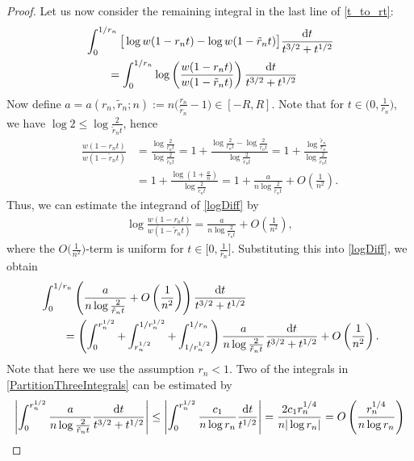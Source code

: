 \begin{proof}
Let us now consider the remaining integral in the last line of \eqref{t_to_rt}:
\begin{align}\nonumber
& \int_0^{1/r_n} \big[\log w(1-r_n t)- \log w(1-\tilde r_n t)\big] \frac{{\rm d}t}{t^{3/2}+t^{1/2}}
 \\\label{logDiff}
 &\qquad= \int_0^{1/r_n} \log \left(\frac{w(1-r_n t)}{w(1-\tilde r_n t)}\right) \frac{{\rm d}t}{t^{3/2}+t^{1/2}}
\end{align}
Now define $a = a(r_n, \tilde r_n ; n) := n\big(\frac{r_n}{\tilde r_n}-1\big) \in [-R, R]$. Note that for $t \in \big(0, \frac{1}{r_n}\big)$, we have $\log 2 \leq \log \frac{2}{\tilde r_n t}$, hence
\begin{align*}
 \frac{w(1-r_n t)}{w(1-\tilde r_n t)} &= \frac{\log \frac{2}{r_nt}}{\log \frac{2}{\tilde r_nt}} = 1 + \frac{\log \frac{2}{r_nt}-\log \frac{2}{\tilde r_nt}}{\log \frac{2}{\tilde r_nt}} =1 + \frac{\log \frac{\tilde r_n}{r_n}}{\log \frac{2}{\tilde r_n t}}
 \\
 &= 1 + \frac{\log (1+\frac{a}{n})}{\log \frac{2}{\tilde r_n t}}= 1 + \frac{a}{n\log \frac{2}{\tilde r_n t}} + O\left(\frac{1}{n^2}\right).
\end{align*}
Thus, we can estimate the integrand of \eqref{logDiff} by
\begin{align*}
 \log \frac{w(1-r_n t)}{w(1-\tilde r_n t)} = \frac{a}{n\log \frac{2}{\tilde r_n t}} + O\left(\frac{1}{n^2}\right),
\end{align*}
where the $O\big(\frac{1}{n^2}\big)$-term is uniform for $t\in\big[0, \frac{1}{r_n}\big]$. Substituting this into \eqref{logDiff}, we obtain
\begin{align}\nonumber
 &\int_0^{1/r_n} \left(\frac{a}{n\log \frac{2}{\tilde r_n t}} + O\left(\frac{1}{n^2}\right)\right) \frac{{\rm d}t}{t^{3/2}+t^{1/2}}
 \\\label{PartitionThreeIntegrals}
 &\qquad= \left(\int_{0}^{r_n^{1/2}}+\int_{r_n^{1/2}}^{1/r_n^{1/2}}+\int_{1/r_n^{1/2}}^{1/r_n}\right) \frac{a}{n\log \frac{2}{\tilde r_n t}} \frac{{\rm d}t}{t^{3/2}+t^{1/2}}+O\left(\frac{1}{n^2}\right).
\end{align}
Note that here we use the assumption $r_n < 1$.
Two of the integrals in \eqref{PartitionThreeIntegrals} can be estimated by
\begin{align*}
 \left|\int_{0}^{r_n^{1/2}} \frac{a}{n\log \frac{2}{\tilde r_n t}} \frac{{\rm d}t}{t^{3/2}+t^{1/2}} \right| \leq \left|\int_{0}^{r_n^{1/2}} \frac{c_1}{n \log r_n} \frac{{\rm d}t}{t^{1/2}}\right| = \frac{2c_1 r_n^{1/4}}{n |\log r_n|} = O\left(\frac{r_n^{1/4}}{n \log r_n}\right)

\end{align*}
\end{proof}
